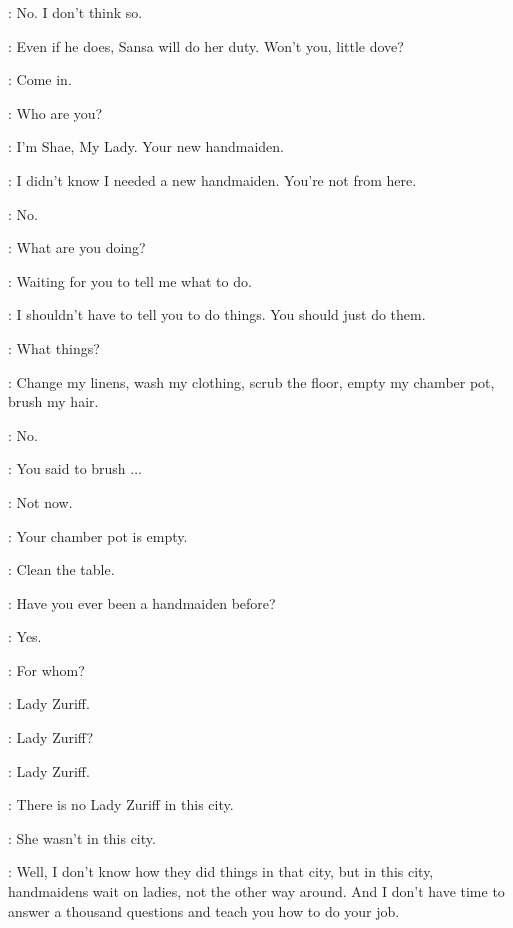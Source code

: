 \TOMMEN: No. I don't think so. 

\CERSEI: Even if he does, Sansa will do her duty. Won't you, little dove? 


\SANSA: Come in. 


\SANSA: Who are you? 

\SHAE: I'm Shae, My Lady. Your new handmaiden. 

\SANSA: I didn't know I needed a new handmaiden. You're not from here. 

\SHAE: No. 

\SANSA: What are you doing? 

\SHAE: Waiting for you to tell me what to do. 

\SANSA: I shouldn't have to tell you to do things. You should just do them. 

\SHAE: What things? 

\SANSA: Change my linens, wash my clothing, scrub the floor, empty my chamber pot, brush my hair. 


\SANSA: No. 

\SHAE: You said to brush $\ldots$  

\SANSA: Not now. 

\SHAE: Your chamber pot is empty. 

\SANSA: Clean the table. 


\SANSA: Have you ever been a handmaiden before? 

\SHAE: Yes. 

\SANSA: For whom? 

\SHAE: Lady Zuriff. 

\SANSA: Lady Zuriff? 

\SHAE: Lady Zuriff. 

\SANSA: There is no Lady Zuriff in this city. 

\SHAE: She wasn't in this city. 

\SANSA: Well, I don't know how they did things in that city, but in this city, handmaidens wait on ladies, not the other way around. And I don't have time to answer a thousand questions and teach you how to do your job. 

